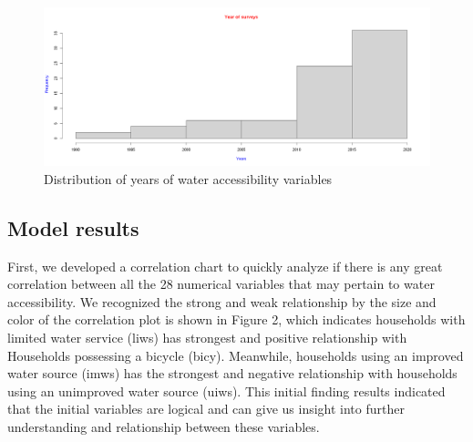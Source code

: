 \documentclass[10pt,twoside]{article}
\numberwithin{equation}{section}
\newcommand{\?}{\stackrel{?}{=}}
\begin{document}
\begin{figure}[h!]
  \centering
  \includegraphics[width=.7\textwidth]{year}
  \caption{Distribution of years of water accessibility variables}
  \label{fig:year}
\end{figure}
\subsection*{Model results}
First, we developed a correlation chart to quickly analyze if there is any great correlation between all the 28 numerical variables that may pertain to water accessibility. We recognized the strong and weak relationship by the size and color of the correlation plot is shown in Figure 2, which indicates households with limited water service (liws) has strongest and positive relationship with Households possessing a bicycle (bicy). Meanwhile, households using an improved water source (imws) has the strongest and negative relationship with households using an unimproved water source (uiws). This initial finding results indicated that the initial variables are logical and can give us insight into further understanding and relationship between these variables. 
\end{document}
